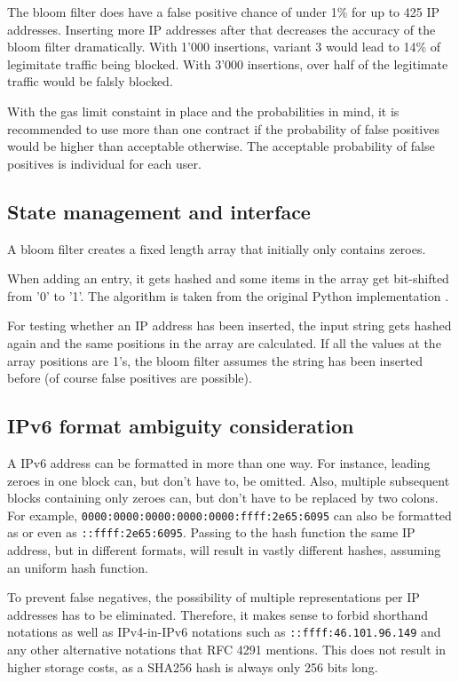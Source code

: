 The bloom filter does have a false positive chance of under 1\% for up to 425 IP addresses. Inserting more IP addresses after that decreases the accuracy of the bloom filter dramatically. With 1'000 insertions, variant 3 would lead to 14\% of legimitate traffic being blocked. With 3'000 insertions, over half of the legitimate traffic would be falsly blocked.

With the gas limit constaint in place and the probabilities in mind, it is recommended to use more than one contract if the probability of false positives would be higher than acceptable otherwise. The acceptable probability of false positives is individual for each user.

\subsection{State management and interface}

A bloom filter creates a fixed length array that initially only contains zeroes.


When adding an entry, it gets hashed and some items in the array get bit-shifted from '0' to '1'. The algorithm is taken from the original Python implementation \cite{SimpleBloomFilter}.



For testing whether an IP address has been inserted, the input string gets hashed again and the same positions in the array are calculated. If all the values at the array positions are 1's, the bloom filter assumes the string has been inserted before (of course false positives are possible).




\subsection{IPv6 format ambiguity consideration}

A IPv6 address can be formatted in more than one way. \cite{RFC4291I66} For instance, leading zeroes in one block can, but don't have to, be omitted. Also, multiple subsequent blocks containing only zeroes can, but don't have to be replaced by two colons.
For example, \texttt{0000:0000:0000:0000:0000:ffff:2e65:6095} can also be formatted as
 or even as \texttt{::ffff:2e65:6095}. Passing to the hash function the same IP address, but in different formats, will result in vastly different hashes, assuming an uniform hash function.

To prevent false negatives, the possibility of multiple representations per IP addresses has to be eliminated. Therefore, it makes sense to forbid shorthand notations as well as IPv4-in-IPv6 notations such as \texttt{::ffff:46.101.96.149} and any other alternative notations that RFC 4291 \cite{RFC4291I66} mentions.
This does not result in higher storage costs, as a SHA256 hash is always only 256 bits long.

